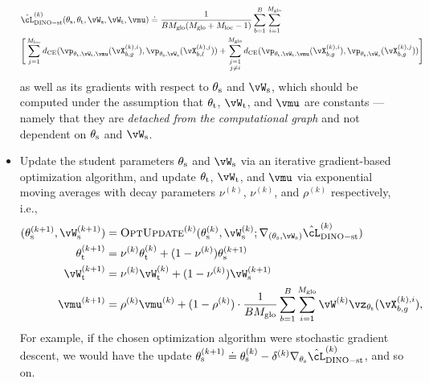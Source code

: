 \documentclass[../../book-main.tex]{subfiles}
\begin{document}
\begin{itemize}
    \begin{align}\label{eq:dino_loss_teacherstudent_empirical}
        &\hat{\cL}_{\dino{}-\student\teacher}^{(k)}(\theta_{\student}, \theta_{\teacher}, \vW_{\student}, \vW_{\teacher}, \vmu) \doteq
        \frac{1}{BM_{\glo}(M_{\glo} + M_{\loc} - 1)}\sum_{b = 1}^{B}\sum_{i = 1}^{M_{\glo}}\\
        &\Bigg[\sum_{j = 1}^{M_{\loc}}d_{\CE}(\vp_{\theta_{\teacher}, \vW_{\teacher}, \vmu}(\vX_{b, g}^{(k), i}), \vp_{\theta_{\student}, \vW_{\student}}(\vX_{b, \ell}^{(k), j})) + \sum_{\substack{j = 1 \\ j \neq i}}^{M_{\glo}}d_{\CE}(\vp_{\theta_{\teacher}, \vW_{\teacher}, \vmu}(\vX_{b, g}^{(k), i}), \vp_{\theta_{\student}, \vW_{\student}}(\vX_{b, g}^{(k), j}))\Bigg]\nonumber
    \end{align}
    as well as its gradients with respect to \(\theta_{\mathrm{s}}\) and \(\vW_{\student}\), which should be computed under the assumption that \(\theta_{\mathrm{t}}\), \(\vW_{\teacher}\), and \(\vmu\) are constants --- namely that they are \textit{detached from the computational graph} and not dependent on \(\theta_{\mathrm{s}}\) and \(\vW_{\student}\).
    \item Update the student parameters \(\theta_{\mathrm{s}}\) and \(\vW_{\student}\) via an iterative gradient-based optimization algorithm, and update \(\theta_{\mathrm{t}}\), \(\vW_{\teacher}\), and \(\vmu\) via exponential moving averages with decay parameters \(\nu^{(k)}\), \(\nu^{(k)}\), and \(\rho^{(k)}\) respectively, i.e., 
    \begin{align}
        (\theta_{\student}^{(k + 1)}, \vW_{\student}^{(k + 1)})
        &= \textsc{OptUpdate}^{(k)}(\theta_{\student}^{(k)}, \vW_{\student}^{(k)}; \nabla_{(\theta_{\student}, \vW_{\student})}\hat{\cL}_{\dino-\student\teacher}^{(k)}) \\
        \theta_{\teacher}^{(k + 1)}
        &= \nu^{(k)}\theta_{\teacher}^{(k)} + (1 - \nu^{(k)})\theta_{\student}^{(k + 1)} \\
        \vW_{\teacher}^{(k + 1)}
        &= \nu^{(k)}\vW_{\teacher}^{(k)} + (1 - \nu^{(k)})\vW_{\student}^{(k + 1)} \\
        \vmu^{(k + 1)}
        &= \rho^{(k)}\vmu^{(k)} + (1 - \rho^{(k)})\cdot\frac{1}{BM_{\glo}}\sum_{b = 1}^{B}\sum_{i = 1}^{M_{\glo}}\vW^{(k)}\vz_{\theta_{\teacher}}(\vX_{b, g}^{(k), i}),
    \end{align}
    For example, if the chosen optimization algorithm were stochastic gradient descent, we would have the update \(\theta_{\student}^{(k + 1)} \doteq \theta_{\student}^{(k)} - \delta^{(k)}\nabla_{\theta_{\student}}\hat{\cL}_{\dino{}-\student\teacher}^{(k)}\), and so on.
\end{itemize}
\end{document}
